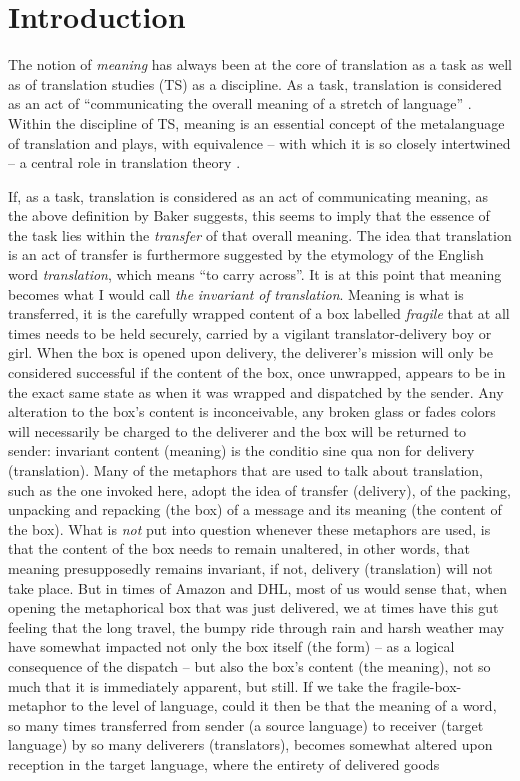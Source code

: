 \chapter{Introduction}

The notion of \textit{meaning} has always been at the core of translation as a task as well as of translation studies (TS) as a discipline. As a task, translation is considered as an act of “communicating the overall meaning of a stretch of language” \citep[10]{baker_other_1992}. Within the discipline of TS, meaning is an essential concept of the metalanguage of translation and plays, with equivalence – with which it is so closely intertwined – a central role in translation theory \citep{halverson_concept_1997}.



If, as a task, translation is considered as an act of communicating meaning, as the above definition by Baker suggests, this seems to imply that the essence of the task lies within the \textit{transfer} of that overall meaning. The idea that translation is an act of transfer is furthermore suggested by the etymology of the English word \textit{translation}, which means “to carry across”. It is at this point that meaning becomes what I would call \textit{the} \textit{invariant} \textit{of} \textit{translation}. Meaning is what is transferred, it is the carefully wrapped content of a box labelled \textit{fragile} that at all times needs to be held securely, carried by a vigilant translator-delivery boy or girl. When the box is opened upon delivery, the deliverer’s mission will only be considered successful if the content of the box, once unwrapped, appears to be in the exact same state as when it was wrapped and dispatched by the sender. Any alteration to the box’s content is inconceivable, any broken glass or fades colors will necessarily be charged to the deliverer and the box will be returned to sender: invariant content (meaning) is the conditio sine qua non for delivery (translation). Many of the metaphors that are used to talk about translation, such as the one invoked here, adopt the idea of transfer (delivery), of the packing, unpacking and repacking (the box) of a message and its meaning (the content of the box). What is \textit{not} put into question whenever these metaphors are used, is that the content of the box needs to remain unaltered, in other words, that meaning presupposedly remains invariant, if not, delivery (translation) will not take place. But in times of Amazon and DHL, most of us would sense that, when opening the metaphorical box that was just delivered, we at times have this gut feeling that the long travel, the bumpy ride through rain and harsh weather may have somewhat impacted not only the box itself (the form) – as a logical consequence of the dispatch – but also the box’s content (the meaning), not so much that it is immediately apparent, but still. If we take the fragile-box-metaphor to the level of language, could it then be that the meaning of a word, so many times transferred from sender (a source language) to receiver (target language) by so many deliverers (translators), becomes somewhat altered upon reception in the target language, where the entirety of delivered goods 